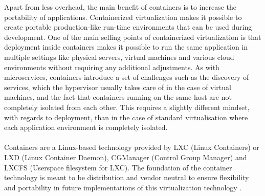 \noindent
Apart from less overhead, the main benefit of containers is to increase the portability of applications. Containerized virtualization makes it possible to create portable production-like run-time environments that can be used during development. One of the main selling points of containerized virtualization is that deployment inside containers makes it possible to run the same application in multiple settings like physical servers, virtual machines and various cloud environments without requiring any additional adjustments. As with microservices, containers introduce a set of challenges such as the discovery of services, which the hypervisor usually takes care of in the case of virtual machines, and the fact that containers running on the same host are not completely isolated from each other. This requires a slightly different mindset, with regards to deployment, than in the case of standard virtualisation where each application environment is completely isolated.
\\ \\
Containers are a Linux-based technology provided by LXC (Linux Containers) or LXD (Linux Container Daemon), CGManager (Control Group Manager) and LXCFS (Userspace filesystem for LXC). The foundation of the container technology is meant to be distribution and vendor neutral to ensure flexibility and portability in future implementations of this virtualization technology \cite{linuxContainers}.


